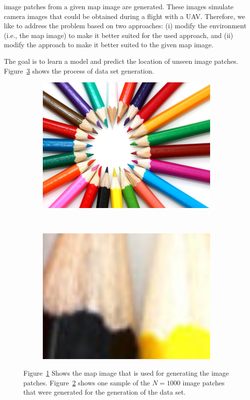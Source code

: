 \documentclass{article}
\begin{document}
image patches from a given map image are generated. These images
simulate camera images that could be obtained during a flight with a
UAV. Therefore, we like to address the problem based on two
approaches: (i) modify the environment (i.e., the map image) to make it
better suited for the used approach, and (ii) modify the approach to
make it better suited to the given map image. 

The goal is to learn a model and predict the location of unseen image
patches. Figure~\ref{fig:generation} shows the process of data set
generation.

\begin{figure}
  \centering
  \begin{subfigure}[b]{0.4\textwidth}
    \includegraphics[width=\textwidth]{pencils}
    \label{fig:mapimage}
  \end{subfigure}%
~
  \begin{subfigure}[b]{0.4\textwidth}
    \includegraphics[width=\textwidth]{patches}
    \label{fig:patch}
  \end{subfigure}
  \caption{Figure~\ref{fig:mapimage} Shows the map image that is used
    for generating the image patches. Figure~\ref{fig:patch} shows one
    sample of the $N = 1000$ image patches that were generated for the
  generation of the data set.}
\label{fig:generation}
\end{figure}
\end{document}
